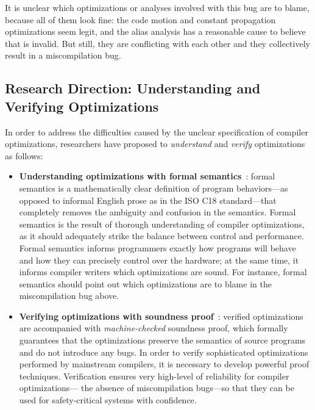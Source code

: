 \noindent It is unclear which optimizations or analyses involved with this bug are to blame, because
all of them look fine: the code motion and constant propagation optimizations seem legit, and the
alias analysis has a reasonable cause to believe that  is invalid.  But still, they are
conflicting with each other and they collectively result in a miscompilation bug.



\subsection{Research Direction: Understanding and Verifying Optimizations}

In order to address the difficulties caused by the unclear specification of compiler optimizations,
researchers have proposed to \emph{understand} and \emph{verify} optimizations as follows:

\begin{itemize}
\item \textbf{Understanding optimizations with formal
    semantics}~\cite{norrish1998c,leroy:compcert,ellison2012executable}: formal semantics is a
  mathematically clear definition of program behaviors---as opposed to informal English prose as in
  the ISO C18 standard---that completely removes the ambiguity and confusion in the semantics.
  Formal semantics is the result of thorough understanding of compiler optimizations, as it should
  adequately strike the balance between control and performance.  Formal semantics informs
  programmers exactly how programs will behave and how they can precisely control over the hardware;
  at the same time, it informs compiler writers which optimizations are sound.  For instance, formal
  semantics should point out which optimizations are to blame in the miscompilation bug above.

\item \textbf{Verifying optimizations with soundness proof}~\cite{compcert,vellvm}: verified
  optimizations are accompanied with \emph{machine-checked} soundness proof, which formally
  guarantees that the optimizations preserve the semantics of source programs and do not introduce
  any bugs.  In order to verify sophisticated optimizations performed by mainstream compilers, it is
  necessary to develop powerful proof techniques.  Verification ensures very high-level of
  reliability for compiler optimizations---\ie{} the absence of miscompilation bugs---so that they
  can be used for safety-critical systems with confidence.

\end{itemize}

